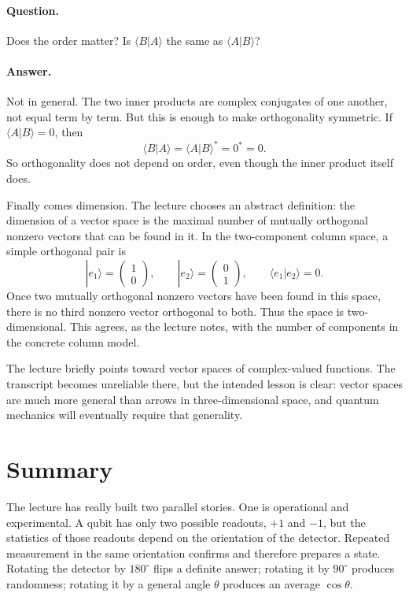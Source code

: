 \paragraph{Question.} Does the order matter? Is \(\langle B|A\rangle\) the same as \(\langle A|B\rangle\)?

\paragraph{Answer.} Not in general. The two inner products are complex conjugates of one another, not equal term by term. But this is enough to make orthogonality symmetric. If \(\langle A|B\rangle=0\), then
\[
\langle B|A\rangle=\langle A|B\rangle^*=0^*=0.
\]
So orthogonality does not depend on order, even though the inner product itself does.

Finally comes dimension. The lecture chooses an abstract definition: the dimension of a vector space is the maximal number of mutually orthogonal nonzero vectors that can be found in it. In the two-component column space, a simple orthogonal pair is
\begin{equation}
|e_1\rangle=
\begin{pmatrix}
1\\
0
\end{pmatrix},
\qquad
|e_2\rangle=
\begin{pmatrix}
0\\
1
\end{pmatrix},
\qquad
\langle e_1|e_2\rangle=0.
\end{equation}
Once two mutually orthogonal nonzero vectors have been found in this space, there is no third nonzero vector orthogonal to both. Thus the space is two-dimensional. This agrees, as the lecture notes, with the number of components in the concrete column model.

\begin{remark}
The lecture briefly points toward vector spaces of complex-valued functions. The transcript becomes unreliable there, but the intended lesson is clear: vector spaces are much more general than arrows in three-dimensional space, and quantum mechanics will eventually require that generality.
\end{remark}

\section{Summary}

The lecture has really built two parallel stories. One is operational and experimental. A qubit has only two possible readouts, \(+1\) and \(-1\), but the statistics of those readouts depend on the orientation of the detector. Repeated measurement in the same orientation confirms and therefore prepares a state. Rotating the detector by \(180^\circ\) flips a definite answer; rotating it by \(90^\circ\) produces randomness; rotating it by a general angle \(\theta\) produces an average \(\cos\theta\).

